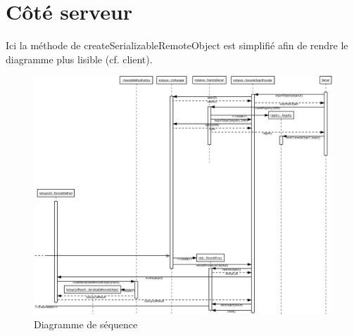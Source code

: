 \section{Côté serveur}
Ici la méthode de createSerializableRemoteObject est simplifié afin de rendre le diagramme plus lisible (cf. client).
\begin{figure}[H]
\begin{center}
\includegraphics[scale=0.5,angle=90]{img/diag_sequence_server.jpeg}
\caption{Diagramme de séquence}
\end{center}
\end{figure}

